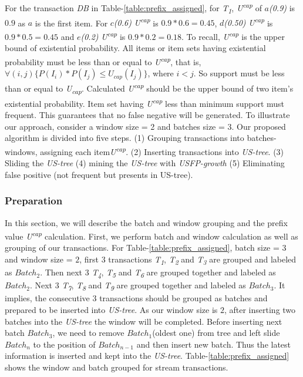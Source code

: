\documentclass[conference]{IEEEtran}
\begin{document}
For the transaction \emph{DB} in Table-\ref{table:prefix_assigned}, for \emph{T\textsubscript{1}}, \emph{U\textsuperscript{cap}} of \emph{$a$(0.9)} is $0.9$ as $a$ is the first item. For \emph{$c$(0.6)} \emph{U\textsuperscript{cap}} is $0.9*0.6=0.45$, \emph{$d$(0.50)} \emph{U\textsuperscript{cap}} is $0.9*0.5=0.45$ and \emph{$e$(0.2)} \emph{U\textsuperscript{cap}} is $0.9*0.2=0.18$. To recall, \emph{U\textsuperscript{cap}} is the upper bound of existential probability. All items or item sets having existential probability must be less than or equal to \emph{U\textsuperscript{cap}}, that is, $\forall(i,j)\{ P(I_i)*P(I_j)\leq U_{cap}(I_j)\}$, where $i < j$. So support must be less than or equal to \emph{U\textsubscript{cap}}. Calculated \emph{U\textsuperscript{cap}} should be the upper bound of two item's existential probability. Item set having \emph{U\textsuperscript{cap}} less than minimum support must frequent. This guarantees that no false negative will be generated.
To illustrate our approach, consider a window size = 2 and batches size = 3. Our proposed algorithm is divided into five steps. (1) Grouping transactions into batches-windows, assigning each item\emph{U\textsuperscript{cap}}. (2) Inserting transactions into \emph {US-tree}. (3) Sliding the \emph {US-tree} (4) mining the \emph {US-tree} with \emph{USFP-growth} (5) Eliminating false positive (not frequent but presents in US-tree).

\subsubsection{Preparation}

%

In this section, we will describe the batch and window grouping and the prefix value \emph{U\textsuperscript{cap}} calculation. First, we perform batch and window calculation as well as grouping of our transactions. For Table-\ref{table:prefix_assigned}, batch size = \emph{$3$} and window size = \emph{$2$}, first \emph{$3$} transactions \emph{T\textsubscript{1}}, \emph{T\textsubscript{2}} and \emph{T\textsubscript{3}} are grouped and labeled as $Batch_{2}$. Then next \emph{$3$} \emph{T\textsubscript{4}}, \emph{T\textsubscript{5}} and \emph{T\textsubscript{6}} are grouped together and labeled as $Batch_{2}$. Next \emph{$3$} \emph{T\textsubscript{7}}, \emph{T\textsubscript{8}} and \emph{T\textsubscript{9}} are grouped together and labeled as $Batch_{3}$. It implies, the consecutive  \emph{$3$} transactions should be grouped as batches and prepared to be inserted into \emph{US-tree}. As our window size is $2$, after inserting two batches into the \emph{US-tree} the window will be completed. Before inserting next batch $Batch_{3}$, we need to remove $Batch_{1}$(oldest one) from tree and left slide $Batch_{n}$ to the position of $Batch_{n-1}$ and then insert new batch. Thus the latest information is inserted and kept into the \emph{US-tree}. Table-\ref{table:prefix_assigned} shows the window and batch grouped for stream transactions.
\end{document}
